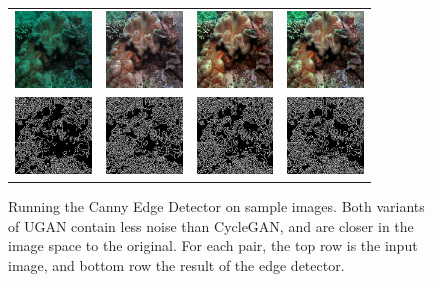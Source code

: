 \documentclass[letterpaper, 10pt, conference]{ieeeconf}
\begin{document}
\begin{figure}
\begin{tabular}{p{1.7cm} p{1.7cm} p{1.7cm} p{1.7cm}}
   \includegraphics[width=0.8in]{4_original} &
   \includegraphics[width=0.8in]{4_cimg} &
   \includegraphics[width=0.8in]{4_u0img} &
   \includegraphics[width=0.8in]{4_u1img} \\ [-1ex]
   \includegraphics[width=0.8in]{4_oedges} &
   \includegraphics[width=0.8in]{4_cedges} &
   \includegraphics[width=0.8in]{4_u0edges} &
   \includegraphics[width=0.8in]{4_u1edges} \\

\end{tabular}
\caption{Running the Canny Edge Detector on sample images. Both variants of UGAN contain less noise than CycleGAN,
and are closer in the image space to the original. For each pair, the top row is the input image, and bottom row
the result of the edge detector.}
\label{fig:canny_samples}
\end{figure}
\end{document}
